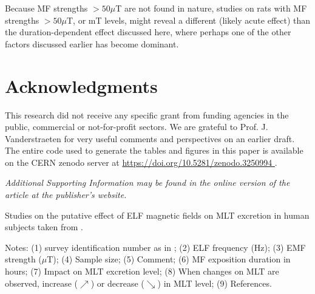 \documentclass[a4]{article}
\begin{document}
 Because MF strengths $>50\mu$T are  not found in nature,
 studies on rats with  MF strengths $>50\mu$T, or  mT levels,  might reveal a different (likely acute effect) than the duration-dependent effect discussed here,  where
  perhaps one of the other factors discussed earlier has become dominant.


 
  
 
 

\section*{Acknowledgments}
This research did not receive any specific grant from funding
agencies in the public, commercial or not-for-profit sectors.
We are grateful to Prof. J. Vanderstraeten for very useful comments and perspectives on an earlier draft.
The entire code used to generate the tables and figures in this paper is available on the CERN zenodo server at \url{
https://doi.org/10.5281/zenodo.3250994 
}.

{\it Additional Supporting Information may be found in the online version of the article at the publisher’s website.}


 




\begin{sidewaystable*}
\small

\caption{Studies on the putative effect of ELF magnetic fields on MLT excretion in human subjects taken from \citet{Halgamuge2013}. 
}
\label{table:halga}
Notes: 
(1) survey identification number as in \citet{Halgamuge2013}; (2) ELF frequency (Hz); (3) EMF strength ($\mu$T);
(4) Sample size; 
 (5) Comment; (6) MF exposition duration in hours; (7) Impact on MLT excretion level; (8) When changes  on MLT are observed, increase ($\nearrow$) or decrease ($\searrow$) in MLT level;  (9) References.
\end{sidewaystable*}
\end{document}
